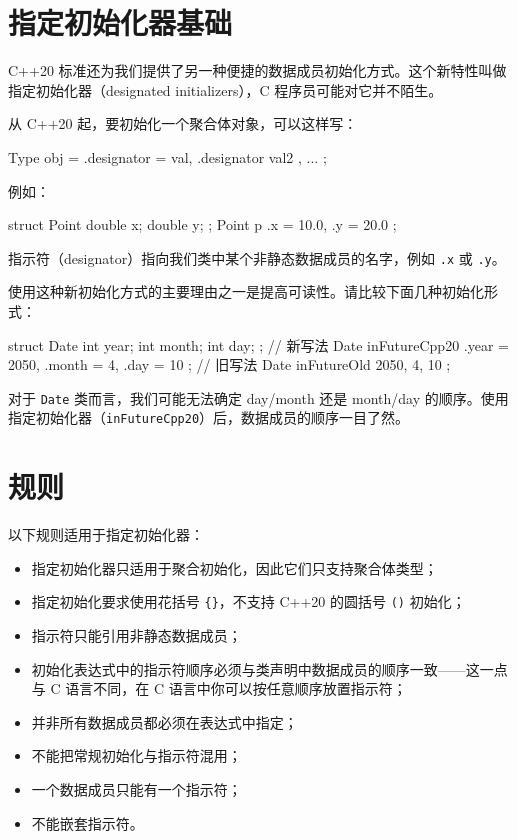 \section{指定初始化器基础}

C++20 标准还为我们提供了另一种便捷的数据成员初始化方式。这个新特性叫做指定初始化器（designated initializers），C 程序员可能对它并不陌生。

从 C++20 起，要初始化一个聚合体对象，可以这样写：

\begin{codebox}[cpp]
Type obj = { .designator = val, .designator { val2 }, ... };
\end{codebox}

例如：

\begin{codebox}[cpp]
struct Point { double x; double y; };
Point p { .x = 10.0, .y = 20.0 };
\end{codebox}

指示符（designator）指向我们类中某个非静态数据成员的名字，例如 \texttt{.x} 或 \texttt{.y}。

使用这种新初始化方式的主要理由之一是提高可读性。请比较下面几种初始化形式：

\begin{codebox}[cpp]
struct Date {
int year;
int month;
int day;
};
// 新写法
Date inFutureCpp20 { .year = 2050, .month = 4, .day = 10 };
// 旧写法
Date inFutureOld
{ 2050, 4, 10 };
\end{codebox}

对于 \texttt{Date} 类而言，我们可能无法确定 day/month 还是 month/day 的顺序。使用指定初始化器（\texttt{inFutureCpp20}）后，数据成员的顺序一目了然。

\section{规则}

以下规则适用于指定初始化器：

\begin{itemize}
\item 指定初始化器只适用于聚合初始化，因此它们只支持聚合体类型；
\item 指定初始化要求使用花括号 \texttt{\{\}}，不支持 C++20 的圆括号 \texttt{()} 初始化；
\item 指示符只能引用非静态数据成员；
\item 初始化表达式中的指示符顺序必须与类声明中数据成员的顺序一致——这一点与 C 语言不同，在 C 语言中你可以按任意顺序放置指示符；
\item 并非所有数据成员都必须在表达式中指定；
\item 不能把常规初始化与指示符混用；
\item 一个数据成员只能有一个指示符；
\item 不能嵌套指示符。
\end{itemize}


